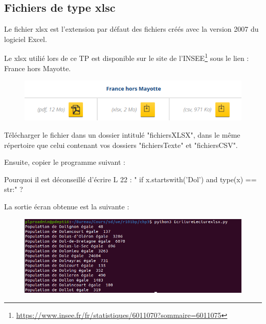 \subsection{Fichiers de type xlsc}

Le fichier xlsx est l'extension par défaut des fichiers créés avec la version 2007 du logiciel Excel.

Le xlsx utilié lors de ce TP est disponible sur le site de l'INSEE\footnote{\url{https://www.insee.fr/fr/statistiques/6011070?sommaire=6011075}}
sous le lien : France hors Mayotte. 


\begin{figure}[H]
    \centering
    \includegraphics[scale = 0.5]{chapitre3/figures/xlsxTl.png}
\end{figure}

Télécharger le fichier dans un dossier intitulé "fichiersXLSX", dans le même répertoire que celui contenant vos dossiers "fichiersTexte" et "fichiersCSV".

Ensuite, copier le programme suivant :




\begin{tcolorbox}[lefttitle=2cm, colframe=gray!75!black, title= \textbf{Exercice}]
Pourquoi il est déconseillé d'écrire L 22 : " if x.startswith('Dol') and type(x) == str:"  ?
\vspace{2cm}
\end{tcolorbox}



La sortie écran obtenue est la suivante : 

\begin{figure}[H]
    \centering
    \includegraphics[scale = 0.5]{chapitre3/figures/xlsxCE.png}
\end{figure}

